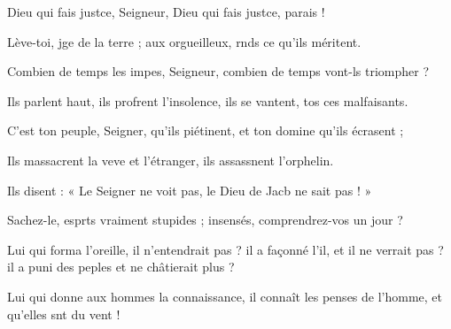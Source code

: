 \item Dieu qui fais justce, Seigneur,\psstar{} Dieu qui fais justce, parais !
\item Lève-toi, jge de la terre ;\psstar{} aux orgueilleux, rnds ce qu’ils méritent.
\item Combien de temps les impes, Seigneur,\psstar{} combien de temps vont-ls triompher ?
\item Ils parlent haut, ils profrent l’insolence,\psstar{} ils se vantent, tos ces malfaisants.
\item C’est ton peuple, Seigner, qu’ils piétinent,\psstar{} et ton domine qu’ils écrasent ;
\item Ils massacrent la veve et l’étranger,\psstar{} ils assassnent l’orphelin.
\item Ils disent : « Le Seigner ne voit pas,\psstar{} le Dieu de Jacb ne sait pas ! »
\item Sachez-le, esprts vraiment stupides ;\psstar{} insensés, comprendrez-vos un jour ?
\item Lui qui forma l’oreille, il n’entendrait pas ?\pscross{} il a façonné l’il, et il ne verrait pas ?\psstar{} il a puni des peples et ne châtierait plus ? 
\item Lui qui donne aux hommes la connaissance,\pscross{} il connaît les penses de l’homme,\psstar{} et qu’elles snt du vent !